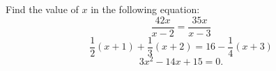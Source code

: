 Find the value of $x$ in the following equation:
\[
\dfrac{42x}{x-2} = \dfrac{35x}{x-3}
\]
\[
\dfrac{1}{2} (x+1) + \dfrac{1}{3} (x+2) = 16 - \dfrac{1}{4} (x+3)
\]
\[
3x^2 - 14x + 15 = 0.
\]
